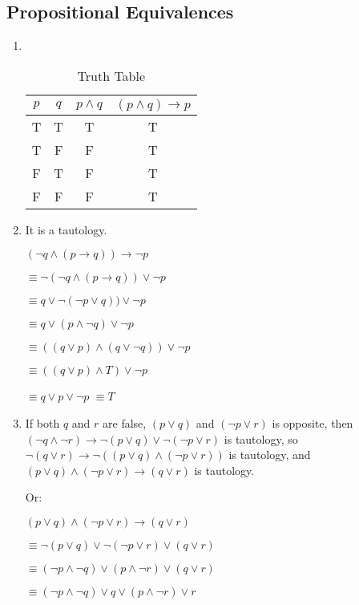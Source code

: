 \documentclass{sig-alternate-05-2015}
\begin{document}
\subsection{Propositional Equivalences}
\begin{enumerate}
\item {\ }
\begin{table}[htb]
	\centering
	\caption{Truth Table}
	\begin{tabular}{cccc} \toprule
		$p$ & $q$ & $p \wedge q$ & $(p \wedge q) \rightarrow p$\\ \midrule
		T & T & T & T\\ 
		T & F & F & T\\
		F & T & F & T\\
		F & F & F & T\\
		\hline\end{tabular}
\end{table}


\item It is a tautology.

$(\neg q \wedge (p \rightarrow q)) \rightarrow \neg p$

$\equiv \neg (\neg q \wedge (p \rightarrow q)) \vee \neg p$

$\equiv q \vee \neg (\neg p \vee q)) \vee \neg p$

$\equiv q \vee ( p \wedge \neg q) \vee \neg p$

$\equiv ((q \vee p) \wedge (q \vee \neg q) ) \vee \neg p$

$\equiv ((q \vee p) \wedge T ) \vee \neg p$

$\equiv q \vee p \vee \neg p$
$\equiv T$

\item If both $q$ and $r$ are false, $(p \vee q)$ and $(\neg p \vee r)$ is opposite, then $(\neg q \wedge \neg r) \rightarrow \neg (p \vee q) \vee \neg (\neg p \vee r)$ is tautology, so $\neg(q \vee r) \rightarrow \neg ((p \vee q) \wedge (\neg p \vee r))$ is tautology, and $(p \vee q) \wedge (\neg p \vee r) \rightarrow (q \vee r)$ is tautology.

Or:

$(p\vee q) \wedge (\neg p \vee r)\rightarrow (q \vee r)$

$\equiv \neg (p\vee q) \vee \neg (\neg p \vee r)\vee  (q \vee r)$

$\equiv (\neg p\wedge \neg q) \vee (p \wedge \neg r)\vee  (q \vee r)$

$\equiv (\neg p\wedge \neg q) \vee q \vee (p \wedge \neg r) \vee r$


\end{enumerate}
\end{document}

